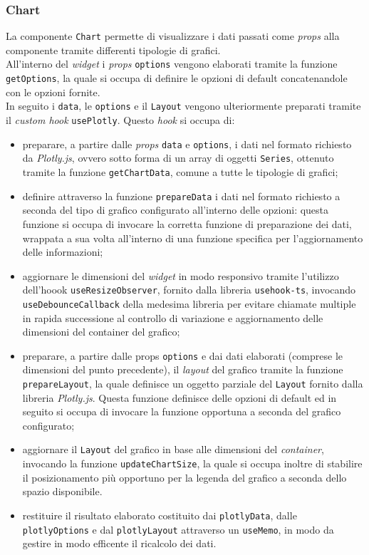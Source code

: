 \subsubsection{Chart}
La componente \texttt{Chart} permette di visualizzare i dati passati come \textit{props} alla componente tramite differenti tipologie di grafici. \\
All'interno del \textit{widget} i \textit{props} \texttt{options} vengono elaborati tramite la funzione \\
\texttt{getOptions}, la quale si occupa di definire le opzioni di
default concatenandole con le opzioni fornite. \\
In seguito i \texttt{data}, le \texttt{options} e il \texttt{Layout} vengono ulteriormente preparati tramite il \textit{custom hook} \texttt{usePlotly}. Questo \textit{hook} si
occupa di:
\begin{itemize}
    \item preparare, a partire dalle \textit{props} \texttt{data} e \texttt{options}, i dati nel formato richiesto da \textit{Plotly.js}, ovvero sotto forma di un array di oggetti
          \texttt{Series}, ottenuto tramite la funzione \texttt{getChartData}, comune a tutte le tipologie di grafici;
    \item definire attraverso la funzione \texttt{prepareData} i dati nel formato richiesto a seconda del tipo di grafico configurato all'interno delle opzioni:
          questa funzione si occupa di invocare la corretta funzione di preparazione dei dati, wrappata a sua volta all'interno di una funzione specifica per l'aggiornamento
          delle informazioni;
    \item aggiornare le dimensioni del \textit{widget} in modo responsivo tramite l'utilizzo dell'hoook \texttt{useResizeObserver}, fornito dalla libreria \texttt{usehook-ts},
          invocando \\
          \texttt{useDebounceCallback} della medesima libreria per evitare chiamate multiple in rapida successione al controllo di variazione e aggiornamento
          delle dimensioni del container del grafico;
    \item preparare, a partire dalle props \texttt{options} e dai dati elaborati (comprese le dimensioni del punto precedente), il \textit{layout} del grafico tramite la funzione \\
          \texttt{prepareLayout}, la quale definisce un oggetto parziale del \texttt{Layout} fornito dalla libreria \textit{Plotly.js}. Questa funzione definisce delle opzioni
          di default ed in seguito si occupa di invocare la funzione opportuna a seconda del grafico configurato;
    \item aggiornare il \texttt{Layout} del grafico in base alle dimensioni del \textit{container}, invocando la funzione \texttt{updateChartSize}, la quale si occupa inoltre di stabilire
          il posizionamento più opportuno per la legenda del grafico a seconda dello spazio disponibile.
    \item restituire il risultato elaborato costituito dai \texttt{plotlyData}, dalle \texttt{plotlyOptions} e dal \texttt{plotlyLayout} attraverso un \texttt{useMemo}, in modo da
          gestire in modo efficente il ricalcolo dei dati.
\end{itemize}
